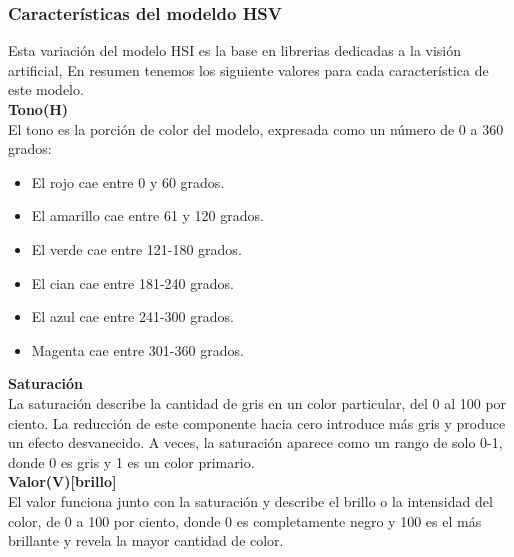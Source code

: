 \subsubsection{Características del modeldo HSV}
Esta variación del modelo HSI es la base en librerias dedicadas a la visión artificial,
En resumen tenemos los siguiente valores para cada característica de este modelo.\\
\textbf{Tono(H)}\\
El tono es la porción de color del modelo, expresada como un número de 0 a 360 grados:
\begin{itemize}
    \item El rojo cae entre 0 y 60 grados.
    \item El amarillo cae entre 61 y 120 grados.
    \item El verde cae entre 121-180 grados.
    \item El cian cae entre 181-240 grados.
    \item El azul cae entre 241-300 grados.
    \item Magenta cae entre 301-360 grados.
\end{itemize}
\textbf{Saturación}\\
La saturación describe la cantidad de gris en un color particular, del 0 al 100 por 
ciento. La reducción de este componente hacia cero introduce más gris y produce un 
efecto desvanecido. A veces, la saturación aparece como un rango de solo 0-1, donde 0 
es gris y 1 es un color primario.\\
\textbf{Valor(V)[brillo]}\\
El valor funciona junto con la saturación y describe el brillo o la intensidad del 
color, de 0 a 100 por ciento, donde 0 es completamente negro y 100 es el más brillante 
y revela la mayor cantidad de color.

